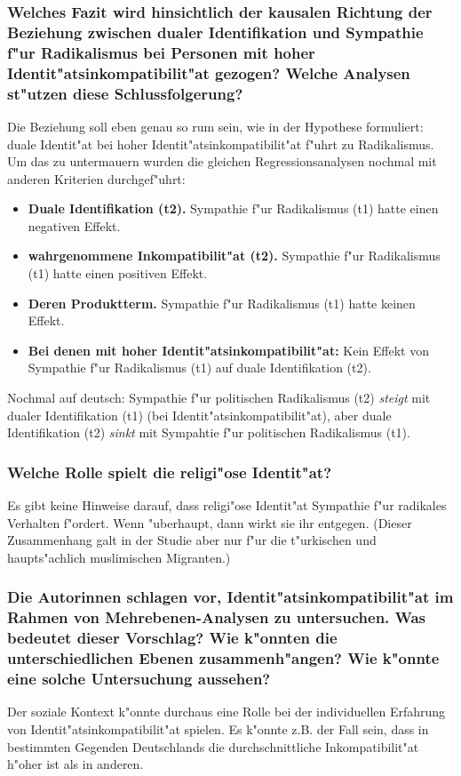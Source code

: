 \subsubsection{Welches Fazit wird hinsichtlich der kausalen Richtung der Beziehung zwischen dualer Identifikation und Sympathie f"ur Radikalismus bei Personen mit hoher Identit"atsinkompatibilit"at gezogen? Welche Analysen st"utzen diese Schlussfolgerung?}
Die Beziehung soll eben genau so rum sein, wie in der Hypothese formuliert: duale Identit"at bei hoher Identit"atsinkompatibilit"at f"uhrt zu Radikalismus. Um das zu untermauern wurden die gleichen Regressionsanalysen nochmal mit anderen Kriterien durchgef"uhrt:
\begin{itemize}
        \item \textbf{Duale Identifikation (t2).} Sympathie f"ur Radikalismus (t1) hatte einen negativen Effekt.
        \item \textbf{wahrgenommene Inkompatibilit"at (t2).} Sympathie f"ur Radikalismus (t1) hatte einen positiven Effekt.
        \item \textbf{Deren Produktterm.} Sympathie f"ur Radikalismus (t1) hatte keinen Effekt.
        \item \textbf{Bei denen mit hoher Identit"atsinkompatibilit"at:} Kein Effekt von Sympathie f"ur Radikalismus (t1) auf duale Identifikation (t2).
\end{itemize}

\noindent Nochmal auf deutsch: Sympathie f"ur politischen Radikalismus (t2) \emph{steigt} mit dualer Identifikation (t1) (bei Identit"atsinkompatibilit"at), aber duale Identifikation (t2) \emph{sinkt} mit Sympahtie f"ur politischen Radikalismus (t1). 

\subsubsection{Welche Rolle spielt die religi"ose Identit"at?}
Es gibt keine Hinweise darauf, dass religi"ose Identit"at Sympathie f"ur radikales Verhalten f"ordert. Wenn "uberhaupt, dann wirkt sie ihr entgegen. (Dieser Zusammenhang galt in der Studie aber nur f"ur die t"urkischen und haupts"achlich muslimischen Migranten.)

\subsubsection{Die Autorinnen schlagen vor, Identit"atsinkompatibilit"at im Rahmen von Mehrebenen-Analysen zu untersuchen. Was bedeutet dieser Vorschlag? Wie k"onnten die unterschiedlichen Ebenen zusammenh"angen? Wie k"onnte eine solche Untersuchung aussehen?}

Der soziale Kontext k"onnte durchaus eine Rolle bei der individuellen Erfahrung von Identit"atsinkompatibilit"at spielen. Es k"onnte z.B. der Fall sein, dass in bestimmten Gegenden Deutschlands die durchschnittliche Inkompatibilit"at h"oher ist als in anderen. 
